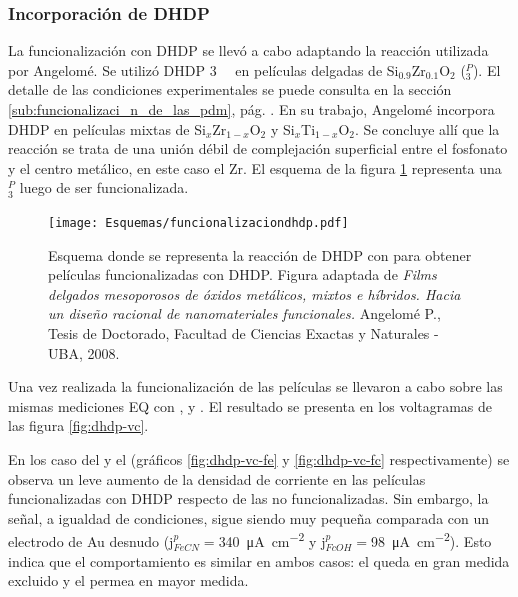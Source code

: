 		\subsubsection{Incorporación de DHDP}
	
			La funcionalización con DHDP se llevó a cabo adaptando la reacción utilizada por Angelomé\cite{Angelome2008}. Se utilizó DHDP \SI{3}{\milli\Molar} en películas delgadas de Si$_{0.9}$Zr$_{0.1}$O$_2$ (\pdmZ$^P_3$). El detalle de las condiciones experimentales se puede consulta en la sección \ref{sub:funcionalizaci_n_de_las_pdm}, pág. \pageref{sub:funcionalizaci_n_de_las_pdm}. En su trabajo, Angelomé incorpora DHDP en películas mixtas de Si$_x$Zr$_{1-x}$O$_2$ y Si$_x$Ti$_{1-x}$O$_2$. Se concluye allí que la reacción se trata de una unión débil de complejación superficial entre el fosfonato y el centro metálico, en este caso el Zr. El esquema de la figura \ref{esq:dhdp-esquema} representa una \pdmZ$^P_3$ luego de ser funcionalizada.\vspace*{-1.5mm}

				 \begin{figure}[ht!]	
					\centering
			 	    \texttt{[image: Esquemas/funcionalizaciondhdp.pdf]}
			        \caption[Funcionalización con DHDP 3mM]{Esquema donde se representa la reacción de DHDP con \pdmZ\space para obtener películas funcionalizadas con DHDP. Figura adaptada de \textit{Films delgados mesoporosos de óxidos metálicos, mixtos e híbridos. Hacia un diseño racional de nanomateriales funcionales.} Angelomé P., Tesis de Doctorado, Facultad de Ciencias Exactas y Naturales - UBA, 2008.\cite{Angelome2008}}
			        \label{esq:dhdp-esquema}
			      	\end{figure}

			\vspace*{2mm} Una vez realizada la funcionalización de las películas se llevaron a cabo sobre las mismas mediciones EQ con \fe, \fc\space y \ru. El resultado se presenta en los voltagramas de las figura \ref{fig:dhdp-vc}. 

		    En los caso del \fe\space y el \fc\space (gráficos \ref{fig:dhdp-vc-fe} y \ref{fig:dhdp-vc-fc} respectivamente) se observa un leve aumento de la densidad de corriente en las películas funcionalizadas con DHDP respecto de las no funcionalizadas. Sin embargo, la señal, a igualdad de condiciones, sigue siendo muy pequeña comparada con un electrodo de Au desnudo (j$^p_{FeCN}\!=$\SI{340}{\micro\ampere\per\square\cm} y j$^p_{FcOH}\!=$\SI{98}{\micro\ampere\per\square\cm}). Esto indica que el comportamiento es similar en ambos casos: el \fe\space queda en gran medida excluido y el \fc\space permea en mayor medida.


